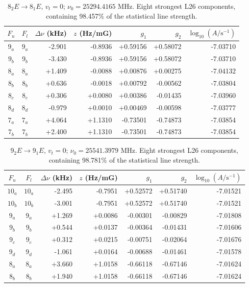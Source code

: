 \begin{table}[!htbp]
\centering\small\renewcommand{\arraystretch}{1.1}\setlength{\tabcolsep}{5pt}
\caption{$8_{2} E\rightarrow 8_{1} E$, $v_t=0$; $\nu_0=25294.4165$ MHz. Eight strongest L26 components, containing 98.457\% of the statistical line strength.}
\label{tab:sm-zeeman-25p294}
\begin{tabular}{ccrrrrr}
\hline\hline
$F_u$ & $F_l$ & $\Delta\nu$ (kHz) & $z$ (Hz/mG) & $g_1$ & $g_2$ & $\log_{10}(A/\mathrm{s}^{-1})$ \\
\hline
$9_{a}$ & $9_{a}$ & -2.901 & -0.8936 & +0.59156 & +0.58072 & -7.03710\\
$9_{b}$ & $9_{b}$ & -3.430 & -0.8936 & +0.59156 & +0.58072 & -7.03710\\
$8_{a}$ & $8_{a}$ & +1.409 & -0.0088 & +0.00876 & +0.00275 & -7.04132\\
$8_{b}$ & $8_{b}$ & +0.636 & -0.0018 & +0.00792 & -0.00562 & -7.03804\\
$8_{c}$ & $8_{c}$ & +0.306 & +0.0080 & +0.00386 & -0.01435 & -7.03960\\
$8_{d}$ & $8_{d}$ & -0.979 & +0.0010 & +0.00469 & -0.00598 & -7.03777\\
$7_{a}$ & $7_{a}$ & +4.064 & +1.1310 & -0.73501 & -0.74873 & -7.03854\\
$7_{b}$ & $7_{b}$ & +2.400 & +1.1310 & -0.73501 & -0.74873 & -7.03854\\
\hline\end{tabular}
\end{table}

\begin{table}[!htbp]
\centering\small\renewcommand{\arraystretch}{1.1}\setlength{\tabcolsep}{5pt}
\caption{$9_{2} E\rightarrow 9_{1} E$, $v_t=0$; $\nu_0=25541.3979$ MHz. Eight strongest L26 components, containing 98.781\% of the statistical line strength.}
\label{tab:sm-zeeman-25p541}
\begin{tabular}{ccrrrrr}
\hline\hline
$F_u$ & $F_l$ & $\Delta\nu$ (kHz) & $z$ (Hz/mG) & $g_1$ & $g_2$ & $\log_{10}(A/\mathrm{s}^{-1})$ \\
\hline
$10_{a}$ & $10_{a}$ & -2.495 & -0.7951 & +0.52572 & +0.51740 & -7.01521\\
$10_{b}$ & $10_{b}$ & -3.001 & -0.7951 & +0.52572 & +0.51740 & -7.01521\\
$9_{a}$ & $9_{a}$ & +1.269 & +0.0086 & -0.00301 & -0.00829 & -7.01808\\
$9_{b}$ & $9_{b}$ & +0.544 & +0.0137 & -0.00364 & -0.01431 & -7.01606\\
$9_{c}$ & $9_{c}$ & +0.312 & +0.0215 & -0.00751 & -0.02064 & -7.01676\\
$9_{d}$ & $9_{d}$ & -1.061 & +0.0164 & -0.00688 & -0.01461 & -7.01578\\
$8_{a}$ & $8_{a}$ & +3.660 & +1.0158 & -0.66118 & -0.67146 & -7.01624\\
$8_{b}$ & $8_{b}$ & +1.940 & +1.0158 & -0.66118 & -0.67146 & -7.01624\\
\hline\end{tabular}
\end{table}

